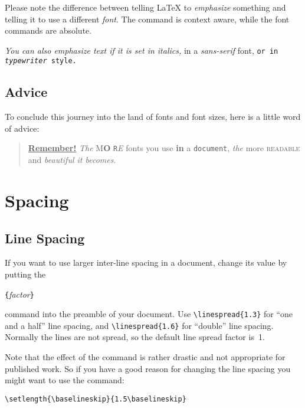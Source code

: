 Please note the difference between telling \LaTeX{} to
\emph{emphasize} something and telling it to use a different
\emph{font}. The  command is context aware, while the font commands are absolute.

\begin{example}
\textit{You can also
  \emph{emphasize} text if
  it is set in italics,}
\textsf{in a
  \emph{sans-serif} font,}
\texttt{or in
  \emph{typewriter} style.}
\end{example}

\subsection{Advice}

To conclude this journey into the land of fonts and font sizes,
here is a little word of advice:\nopagebreak

\begin{quote}
  \underline{\textbf{Remember\Huge!}} \textit{The}
  \textsf{M\textbf{\LARGE O} \texttt{R}\textsl{E}} fonts \Huge you
  \tiny use \footnotesize \textbf{in} a \small \texttt{document},
  \large \textit{the} \normalsize more \textsc{readable} and
  \textsl{\textsf{beautiful} it bec\large o\Large m\LARGE e\huge s}.
\end{quote}

\section{Spacing}

\subsection{Line Spacing}

 If you want to use larger inter-line spacing in a
document, change its value by putting the
\begin{lscommand}
\verb|{|\emph{factor}\verb|}|
\end{lscommand}
\noindent command into the preamble of your document.
Use \verb|\linespread{1.3}| for ``one and a half'' line
spacing, and \verb|\linespread{1.6}| for ``double'' line spacing.  Normally
the lines are not spread, so the default line spread factor
is~1.

Note that the effect of the  command is rather drastic and
not appropriate for published work. So if you have a good reason for
changing the line spacing you might want to use the command:
\begin{lscommand}
\verb|\setlength{\baselineskip}{1.5\baselineskip}|
\end{lscommand}

